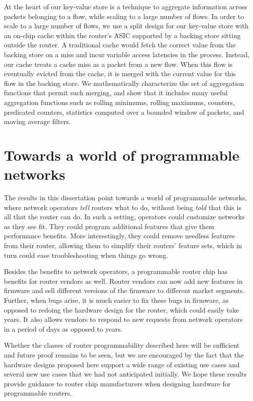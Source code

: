 At the heart of our key-value store is a technique to aggregate information
across packets belonging to a flow, while scaling to a large number of flows.
In order to scale to a large number of flows, we use a split design for our
key-value store with an on-chip cache within the router's ASIC supported by a
backing store sitting outside the router. A traditional cache would fetch the
correct value from the backing store on a miss and incur variable access
latencies in the process. Instead, our cache treats a cache miss as a packet
from a new flow. When this flow is eventually evicted from the cache, it is
merged with the current value for this flow in the backing store.  We
mathematically characterize the set of aggregation functions that permit such
merging, and show that it includes many useful aggregation functions such as
rolling minimums, rolling maximums, counters, predicated counters, statistics
computed over a bounded window of packets, and moving average filters.

\section{Towards a world of programmable networks}

The results in this dissertation point towards a world of programmable
networks, where network operators \textit{tell} routers what to do, without
being \textit{told} that this is all that the router can do. In such a setting,
operators could customize networks as they see fit.  They could program
additional features that give them performance benefits.  More interestingly,
they could remove needless features from their router, allowing them to
simplify their routers' feature sets, which in turn could ease troubleshooting
when things go wrong.

Besides the benefits to network operators, a programmable router chip has
benefits for router vendors as well. Router vendors can now add new features in
firmware and sell different versions of the firmware to different market
segments. Further, when bugs arise, it is much easier to fix these bugs in
firmware, as opposed to redoing the hardware design for the router, which could
easily take years. It also allows vendors to respond to new requests from
network operators in a period of days as opposed to years.

Whether the classes of router programmability described here will be sufficient
and future proof remains to be seen, but we are encouraged by the fact that the
hardware designs proposed here support a wide range of existing use cases and
several new use cases that we had not anticipated initially. We hope these
results provide guidance to router chip manufacturers when designing hardware
for programmable routers.
